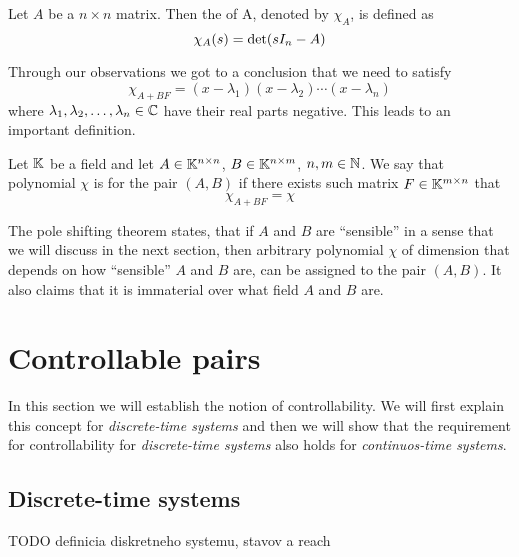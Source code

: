 \begin{definition}
	Let $A$ be a $n\times n$ matrix. Then the  of A, denoted by $\chi_A$, is defined as $$\chi_A(s)=\textnormal{det}(sI_n-A)$$
\end{definition}

Through our observations we got to a conclusion that we need to satisfy $$\chi_{A+BF}=(x-\lambda_1)(x-\lambda_2)\cdots(x-\lambda_n)$$ where $\lambda_1,\lambda_2,\ldots,\lambda_n \in \mathbb{C}$ have their real parts negative. This leads to an important definition.

\begin{definition}
    Let $\mathbb{K}$ be a field and let $A \in \mathbb{K}^{n \times n}$, $B \in \mathbb{K}^{n \times m}$, $n,m \in \mathbb{N}$. We say that polynomial $\chi$ is  for the pair $(A,B)$ if there exists such matrix $F\in\mathbb{K}^{m \times n}$ that $$\chi_{A+BF}=\chi$$
\end{definition}

The pole shifting theorem states, that if $A$ and $B$ are ``sensible'' in a sense that we will discuss in the next section, then arbitrary polynomial $\chi$ of dimension that depends on how ``sensible'' $A$ and $B$ are, can be assigned to the pair $(A,B)$. It also claims that it is immaterial over what field $A$ and $B$ are.

\section{Controllable pairs}

In this section we will establish the notion of controllability. We will first explain this concept for \textit{discrete-time systems} and then we will show that the requirement for controllability for \textit{discrete-time systems} also holds for \textit{continuos-time systems}.

\subsection{Discrete-time systems}

TODO definicia diskretneho systemu, stavov a reach

\begin{definition}
	
\end{definition}

